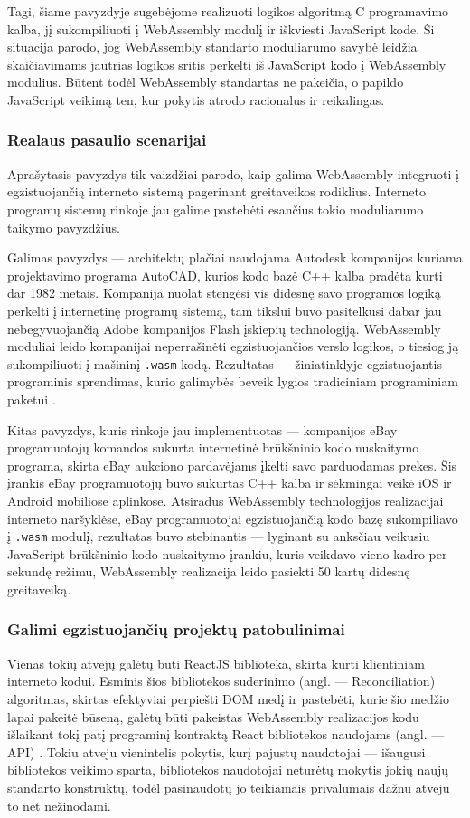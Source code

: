 \documentclass{VUMIFPSkursinis}
\begin{document}
Tagi, šiame pavyzdyje sugebėjome realizuoti logikos algoritmą C programavimo kalba, jį sukompiliuoti į WebAssembly modulį ir iškviesti JavaScript kode. Ši situacija parodo, jog WebAssembly standarto moduliarumo savybė leidžia skaičiavimams jautrias logikos sritis perkelti iš JavaScript kodo į WebAssembly modulius. Būtent todėl WebAssembly standartas ne pakeičia, o papildo JavaScript veikimą ten, kur pokytis atrodo racionalus ir reikalingas.

\subsubsection{Realaus pasaulio scenarijai}

Aprašytasis pavyzdys tik vaizdžiai parodo, kaip galima WebAssembly integruoti į egzistuojančią interneto sistemą pagerinant greitaveikos rodiklius. Interneto programų sistemų rinkoje jau galime pastebėti esančius tokio moduliarumo taikymo pavyzdžius.

Galimas pavyzdys — architektų plačiai naudojama Autodesk kompanijos kuriama projektavimo programa AutoCAD, kurios kodo bazė C++ kalba pradėta kurti dar 1982 metais. Kompanija nuolat stengėsi vis didesnę savo programos logiką perkelti į internetinę programų sistemą, tam tikslui buvo pasitelkusi dabar jau nebegyvuojančią Adobe kompanijos Flash įskiepių technologiją. WebAssembly moduliai leido kompanijai neperrašinėti egzistuojančios verslo logikos, o tiesiog ją sukompiliuoti į mašininį \verb|.wasm| kodą. Rezultatas — žiniatinklyje egzistuojantis programinis sprendimas, kurio galimybės beveik lygios tradiciniam programiniam paketui \cite{Che18}.

Kitas pavyzdys, kuris rinkoje jau implementuotas — kompanijos eBay programuotojų komandos sukurta internetinė brūkšninio kodo nuskaitymo programa, skirta eBay aukciono pardavėjams įkelti savo parduodamas prekes. Šis įrankis eBay programuotojų buvo sukurtas C++ kalba ir sėkmingai veikė iOS ir Android mobiliose aplinkose. Atsiradus WebAssembly technologijos realizacijai interneto naršyklėse, eBay programuotojai egzistuojančią kodo bazę sukompiliavo į \verb|.wasm| modulį, rezultatas buvo stebinantis — lyginant su anksčiau veikusiu JavaScript brūkšninio kodo nuskaitymo įrankiu, kuris veikdavo vieno kadro per sekundę režimu, WebAssembly realizacija leido pasiekti 50 kartų didesnę greitaveiką. \cite{Hea19}

\subsubsection{Galimi egzistuojančių projektų patobulinimai}
Vienas tokių atvejų galėtų būti ReactJS biblioteka, skirta kurti klientiniam interneto kodui. Esminis šios bibliotekos suderinimo (angl. — Reconciliation) algoritmas, skirtas efektyviai perpiešti DOM medį ir pastebėti, kurie šio medžio lapai pakeitė būseną, galėtų būti pakeistas WebAssembly realizacijos kodu išlaikant tokį patį programinį kontraktą React bibliotekos naudojams (angl. — API) \cite{Cla17}. Tokiu atveju vienintelis pokytis, kurį pajustų naudotojai — išaugusi bibliotekos veikimo sparta, bibliotekos naudotojai neturėtų mokytis jokių naujų standarto konstruktų, todėl pasinaudotų jo teikiamais privalumais dažnu atveju to net nežinodami.
\end{document}
